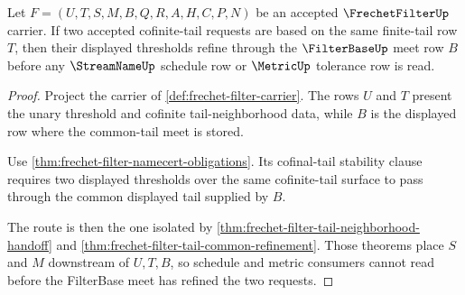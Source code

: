 \begin{theorem}
\label{thm:frechet-filter-cofinal-tail-stability-obligation}
Let $F=(U,T,S,M,B,Q,R,A,H,C,P,N)$ be an accepted $\FrechetFilterUp$ carrier. If two accepted cofinite-tail requests are based on the same finite-tail row $T$, then their displayed thresholds refine through the $\FilterBaseUp$ meet row $B$ before any $\StreamNameUp$ schedule row or $\MetricUp$ tolerance row is read.
\end{theorem}
\begin{proof}
Project the carrier of \autoref{def:frechet-filter-carrier}. The rows $U$ and $T$ present the unary threshold and cofinite tail-neighborhood data, while $B$ is the displayed row where the common-tail meet is stored.

Use \autoref{thm:frechet-filter-namecert-obligations}. Its cofinal-tail stability clause requires two displayed thresholds over the same cofinite-tail surface to pass through the common displayed tail supplied by $B$.

The route is then the one isolated by \autoref{thm:frechet-filter-tail-neighborhood-handoff} and \autoref{thm:frechet-filter-tail-common-refinement}. Those theorems place $S$ and $M$ downstream of $U,T,B$, so schedule and metric consumers cannot read before the FilterBase meet has refined the two requests.
\end{proof}

